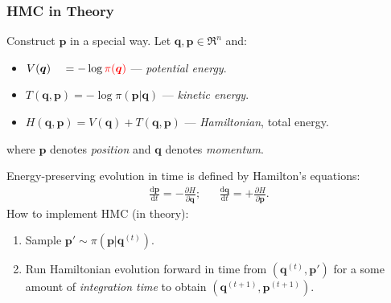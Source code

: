 \documentclass[xcolor=dvipsnames]{beamer}
\begin{document}
\begin{frame}
\frametitle{HMC in Theory}
Construct $\bm{p}$ in a special way. Let $\bm{q},\bm{p}\in \Re^n$ and:
\begin{itemize}
\item[] $V(\bm{q})\phantom{,\bm{p}} = -\log {\color{red}\pi(\bm{q})}$ --- \emph{potential energy}.
\item[] $T(\bm{q}, \bm{p}) = - \log \pi(\bm{p} | \bm{q})$ --- \emph{kinetic energy}.
\item[] $H(\bm{q}, \bm{p}) = V(\bm{q}) + T(\bm{q}, \bm{p})$ --- \emph{Hamiltonian}, total energy.
\end{itemize}
where $\bm{p}$ denotes \emph{position} and $\bm{q}$ denotes \emph{momentum}.

\vspace{0.3cm}

Energy-preserving evolution in time is defined by Hamilton's equations:
\begin{align*}
\frac{\mathrm{d}\bm{p}}{\mathrm{d} t} = - \frac{\partial H}{\partial \bm{q}}; && \frac{\mathrm{d}\bm{q}}{\mathrm{d} t} = + \frac{\partial H}{\partial \bm{p}}.
\end{align*}
How to implement HMC (in theory):
\begin{enumerate}
\item Sample $\bm{p}' \sim \pi(\bm{p}|\bm{q}^{(t)})$.
\item Run Hamiltonian evolution forward in time from $(\bm{q}^{(t)}, \bm{p}')$ for a some amount of {\color{red}\emph{integration time}} to obtain $(\bm{q}^{(t+1)}, \bm{p}^{(t+1)})$.
\end{enumerate}
\end{frame}
\end{document}
